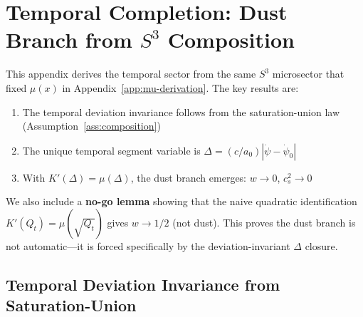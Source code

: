 
\section{Temporal Completion: Dust Branch from $S^3$ Composition}\label{app:temporal-completion}

This appendix derives the temporal sector from the same $S^3$ microsector that fixed $\mu(x)$ in Appendix~\ref{app:mu-derivation}. The key results are:
\begin{enumerate}
\item The temporal deviation invariance follows from the saturation-union law (Assumption~\ref{ass:composition})
\item The unique temporal segment variable is $\Delta = (c/a_0)|\dot\psi - \dot\psi_0|$
\item With $K'(\Delta) = \mu(\Delta)$, the dust branch emerges: $w \to 0$, $c_s^2 \to 0$
\end{enumerate}

We also include a \textbf{no-go lemma} showing that the naive quadratic identification $K'(Q_t) = \mu(\sqrt{Q_t})$ gives $w \to 1/2$ (not dust). This proves the dust branch is not automatic---it is forced specifically by the deviation-invariant $\Delta$ closure.

\subsection{Temporal Deviation Invariance from Saturation-Union}

